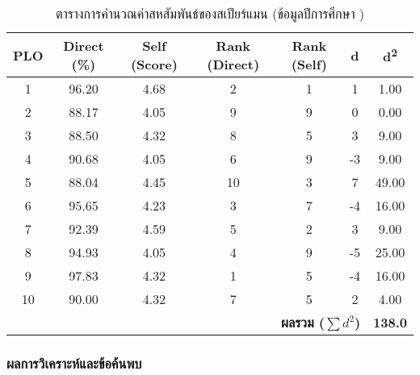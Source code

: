 \begin{longtable}{|c|c|c|c|c|c|c|}
    \caption{ตารางการคำนวณค่าสหสัมพันธ์ของสเปียร์แมน (ข้อมูลปีการศึกษา \printyear{})}
    \label{table:spearman_calc_revised}
    \\
    \hline
    \textbf{PLO} & \textbf{Direct (\%)} & \textbf{Self (Score)} & \textbf{Rank (Direct)} & \textbf{Rank (Self)} & \textbf{d} & \textbf{d\textsuperscript{2}} \\
    \hline
    \endhead
    1  & 96.20 & 4.68 & 2  & 1   & 1    & 1.00    \\ \hline
    2  & 88.17 & 4.05 & 9  & 9   & 0    & 0.00    \\ \hline
    3  & 88.50 & 4.32 & 8  & 5   & 3    & 9.00    \\ \hline
    4  & 90.68 & 4.05 & 6  & 9   & -3   & 9.00    \\ \hline
    5  & 88.04 & 4.45 & 10 & 3   & 7    & 49.00   \\ \hline
    6  & 95.65 & 4.23 & 3  & 7   & -4   & 16.00   \\ \hline
    7  & 92.39 & 4.59 & 5  & 2   & 3    & 9.00    \\ \hline
    8  & 94.93 & 4.05 & 4  & 9   & -5   & 25.00   \\ \hline
    9  & 97.83 & 4.32 & 1  & 5   & -4   & 16.00   \\ \hline
    10 & 90.00 & 4.32 & 7  & 5   & 2    & 4.00    \\ \hline
    \multicolumn{6}{|r|}{\textbf{ผลรวม ($\sum d^2$)}} & \textbf{138.0} \\ \hline
\end{longtable}


\subsubsection*{ผลการวิเคราะห์และข้อค้นพบ}

